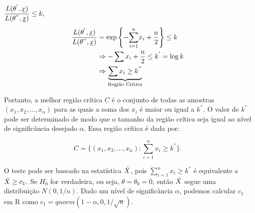 \documentclass[12pt]{beamer}
\begin{document}
\begin{frame}{}
\begin{block}{}
\justifying
$\dfrac{L(\theta^{'},\undertilde{x})}{L(\theta^{''},\undertilde{x})}\leq k,$
\begin{align*}
\dfrac{L(\theta^{'},\undertilde{x})}{L(\theta^{''},\undertilde{x})}&=\exp{\left\{-\Sumi x_{i}+\frac{n}{2}\right\}}\leq k\\
&\Rightarrow -\sum x_{i}+\frac{n}{2}\leq k^{'}=\log{k}\\
&\Rightarrow \underbrace{\sum x_{i}\geq k^{''}}_{\text{Região Crítica}}
\end{align*}
\end{block}
\end{frame}

\begin{frame}{}
\begin{block}{}
\justifying
Portanto, a melhor região crítica $C$ é o conjunto de todas as amostras $(x_1, x_2, \ldots, x_n)$ para as quais a soma dos $x_i$ é maior ou igual a $k^{''}$. O valor de $k^{''}$ pode ser determinado de modo que o tamanho da região crítica seja igual ao nível de significância desejado $\alpha$. Essa região crítica é dada por:

\[
C = \{(x_1, x_2, \ldots, x_n) : \sum_{i=1}^n x_i \geq k^{''}\}.
\]

O teste pode ser baseado na estatística $\Bar{X}$, pois $\sum_{i=1}^n x_i \geq k^{''}$ é equivalente a $\Bar{X}\geq c_{1}.$ Se $H_0$ for verdadeira, ou seja, $\theta = \theta_0 = 0$, então $\Bar{X}$ segue uma distribuição $N(0, 1/n)$. Dado um nível de significância $\alpha$, podemos calcular $c_{1}$ em R como $c_{1} = qnorm(1-\alpha, 0, 1/\sqrt{n})$.



\end{block}
\end{frame}
\end{document}
